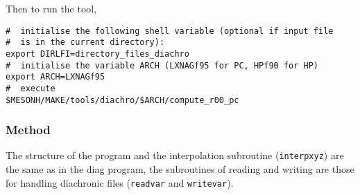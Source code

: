 Then to run the tool,
\begin{verbatim}
#  initialise the following shell variable (optional if input file 
#  is in the current directory):
export DIRLFI=directory_files_diachro
#  initialise the variable ARCH (LXNAGf95 for PC, HPf90 for HP)
export ARCH=LXNAGf95
#  execute 
$MESONH/MAKE/tools/diachro/$ARCH/compute_r00_pc
\end{verbatim}



\subsubsection{Method}
The structure of the program and the interpolation subroutine
 (\texttt{interpxyz}) are the same as in the {\sc diag} program,
 the subroutines of reading and writing are those for handling diachronic files
 (\texttt{readvar} and \texttt{writevar}).
